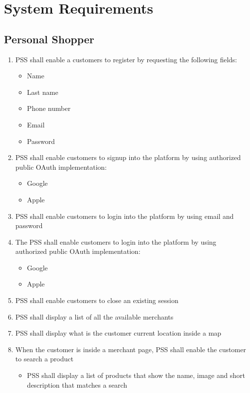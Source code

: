 \section{System Requirements}
\subsection{Personal Shopper}
\begin{enumerate}[label=SY-\arabic*]
    \item PSS shall enable a customers to register by requesting the 
    following fields:
    \begin{itemize}
        \item Name
        \item Last name
        \item Phone number
        \item Email
        \item Password
    \end{itemize}
    \item PSS shall enable customers to signup into the platform by using  
    authorized public OAuth implementation:
    \begin{itemize}
        \item Google
        \item Apple
    \end{itemize}

    \item PSS shall enable customers to login into the platform by 
    using email and password
    \item The PSS shall enable customers to login into the platform by using 
    authorized public OAuth implementation:
    \begin{itemize}
        \item Google
        \item Apple
    \end{itemize}

    \item PSS shall enable customers to close an existing session
    \item PSS shall display a list of all the available merchants
    \item PSS shall display what is the customer current location 
    inside a map
    \item When the customer is inside a merchant page, PSS shall enable the 
    customer to search a product
    \begin{itemize}
        \item PSS shall display a list of products that show the name, image 
        and short description that matches a search
    \end{itemize}
    \end{enumerate}

